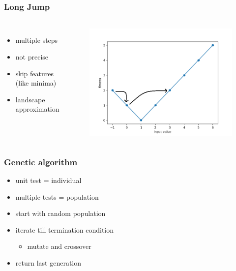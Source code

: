 \begin{frame}
	\frametitle{Long Jump}
	\framesubtitle{\cite{Kauffman.1987}}
	
	\begin{columns}[c]
		

		\begin{itemize}
			\item multiple steps
			\item not precise 
			\item skip features (like minima)
			\item landscape approximation
		\end{itemize}
		
		\begin{figure}
			\includegraphics[width=1\textwidth]{figures/long_jump}
		\end{figure}

	\end{columns}
	
\end{frame}

\begin{frame}
	\frametitle{Genetic algorithm}
		
	\begin{itemize}
		\item unit test = individual
		\item multiple tests = population
		\item start with random population
		\item iterate till termination condition
		\begin{itemize}
			\item mutate and crossover
		\end{itemize}
		\item return last generation
	\end{itemize}
		
	
\end{frame}


